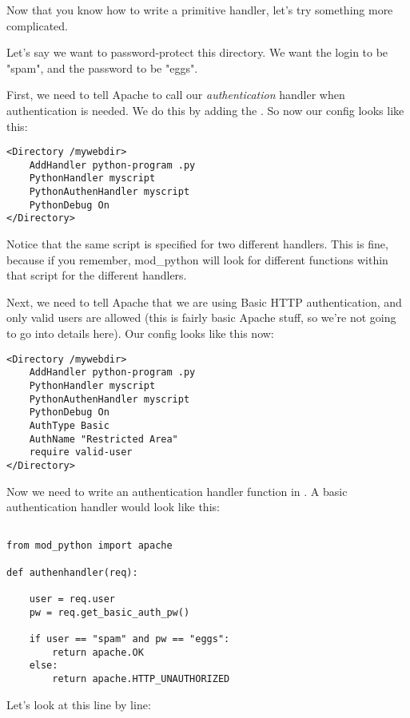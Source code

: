 Now that you know how to write a primitive handler, let's try
something more complicated.

Let's say we want to password-protect this directory. We want the
login to be "spam", and the password to be "eggs".

First, we need to tell Apache to call our \emph{authentication} handler when
authentication is needed. We do this by adding the
. So now our config looks like this:

\begin{verbatim}
<Directory /mywebdir>
    AddHandler python-program .py
    PythonHandler myscript
    PythonAuthenHandler myscript
    PythonDebug On
</Directory>
\end{verbatim}

Notice that the same script is specified for two different
handlers. This is fine, because if you remember, mod_python will look
for different functions within that script for the different handlers.

Next, we need to tell Apache that we are using Basic HTTP
authentication, and only valid users are allowed (this is fairly basic
Apache stuff, so we're not going to go into details here). Our config
looks like this now:

\begin{verbatim}
<Directory /mywebdir>
    AddHandler python-program .py
    PythonHandler myscript
    PythonAuthenHandler myscript
    PythonDebug On
    AuthType Basic
    AuthName "Restricted Area"
    require valid-user
</Directory>
\end{verbatim}          

Now we need to write an authentication handler function in
. A basic authentication handler would look like this:

\begin{verbatim}

from mod_python import apache

def authenhandler(req):

    user = req.user
    pw = req.get_basic_auth_pw()

    if user == "spam" and pw == "eggs":
        return apache.OK
    else:
        return apache.HTTP_UNAUTHORIZED
\end{verbatim}  

Let's look at this line by line: 

